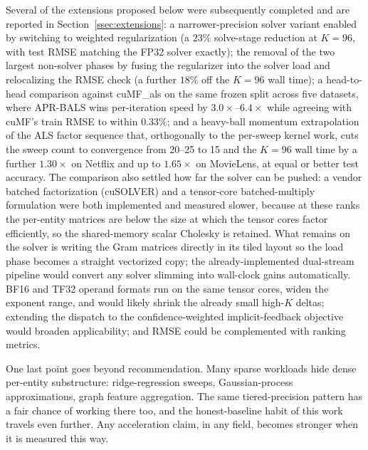 Several of the extensions proposed below were subsequently completed and are reported in Section~\ref{ssec:extensions}: a narrower-precision solver variant enabled by switching to weighted regularization (a $23\%$ solve-stage reduction at $K=96$, with test RMSE matching the FP32 solver exactly); the removal of the two largest non-solver phases by fusing the regularizer into the solver load and relocalizing the RMSE check (a further $18\%$ off the $K=96$ wall time); a head-to-head comparison against cuMF\_als \cite{tan2016faster} on the same frozen split across five datasets, where APR-BALS wins per-iteration speed by $3.0\times$--$6.4\times$ while agreeing with cuMF's train RMSE to within $0.33\%$; and a heavy-ball momentum extrapolation of the ALS factor sequence that, orthogonally to the per-sweep kernel work, cuts the sweep count to convergence from 20--25 to 15 and the $K=96$ wall time by a further $1.30\times$ on Netflix and up to $1.65\times$ on MovieLens, at equal or better test accuracy. The comparison also settled how far the solver can be pushed: a vendor batched factorization (cuSOLVER) and a tensor-core batched-multiply formulation were both implemented and measured slower, because at these ranks the per-entity matrices are below the size at which the tensor cores factor efficiently, so the shared-memory scalar Cholesky is retained. What remains on the solver is writing the Gram matrices directly in its tiled layout so the load phase becomes a straight vectorized copy; the already-implemented dual-stream pipeline would convert any solver slimming into wall-clock gains automatically. BF16 and TF32 operand formats run on the same tensor cores, widen the exponent range, and would likely shrink the already small high-$K$ deltas; extending the dispatch to the confidence-weighted implicit-feedback objective \cite{hu2008collaborative} would broaden applicability; and RMSE could be complemented with ranking metrics.

One last point goes beyond recommendation. Many sparse workloads hide dense per-entity substructure: ridge-regression sweeps, Gaussian-process approximations, graph feature aggregation. The same tiered-precision pattern has a fair chance of working there too, and the honest-baseline habit of this work travels even further. Any acceleration claim, in any field, becomes stronger when it is measured this way.
